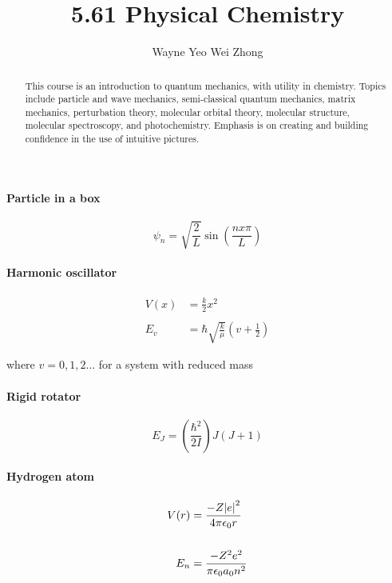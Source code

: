 \documentclass{article}
\title{5.61 Physical Chemistry}
\author{Wayne Yeo Wei Zhong}
\numberwithin{theorem}{section}
\numberwithin{corollary}{section}
\numberwithin{postulate}{section}
\numberwithin{lemma}{section}
\numberwithin{definition}{section}
\begin{document}
\maketitle

\begin{abstract}
  This course is an introduction to quantum mechanics, with utility in chemistry. Topics include particle and wave mechanics, semi-classical quantum mechanics, matrix mechanics, perturbation theory, molecular orbital theory, molecular structure, molecular spectroscopy, and photochemistry. Emphasis is on creating and building confidence in the use of intuitive pictures.
\end{abstract}

\tableofcontents

\newpage

\section*{}
\bigskip\bigskip

\paragraph{Particle in a box}

\begin{equation*}
  \psi_{n} = \sqrt{\frac{2}{L}}\sin{\left(\frac{nx\pi}{L}\right)}
\end{equation*}

\paragraph{Harmonic oscillator}
\begin{align*}
  V(x) &= \frac{k}{2}x^2 \\ \\
  E_v &= \hbar \sqrt{\frac{k}{\mu}}\left( v + \frac{1}{2} \right)
\end{align*}

where $v = 0, 1, 2\dots$ for a system with reduced mass

\paragraph{Rigid rotator}
\begin{equation*}
  E_J = \left(\frac{\hbar^2}{2I}\right)J(J+1)
\end{equation*}

\paragraph{Hydrogen atom}
\begin{align*}
  V(r) &= \frac{-Z\abs{e}^2}{4\pi\epsilon_0r} \\ \\
  E_n &= \frac{-Z^2e^2}{\pi\epsilon_0a_0n^2}
\end{align*}
\end{document}
